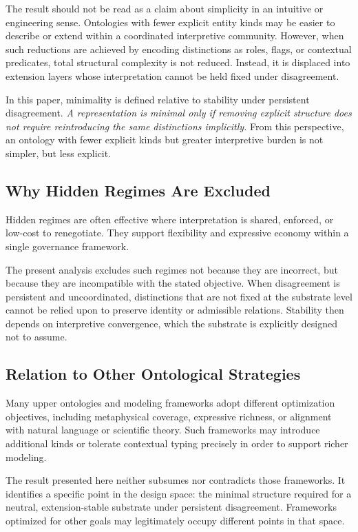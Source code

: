 The result should not be read as a claim about simplicity in an intuitive
or engineering sense.
Ontologies with fewer explicit entity kinds may be easier to describe or extend
within a coordinated interpretive community.
However, when such reductions are achieved by encoding \stabilitycritical{}
distinctions as roles, flags, or contextual predicates, total structural
complexity is not reduced.
Instead, it is displaced into extension layers whose interpretation cannot
be held fixed under disagreement.

In this paper, minimality is defined relative to stability under persistent disagreement.
\emph{A representation is minimal only if removing explicit structure does not
require reintroducing the same distinctions implicitly.}
From this perspective, an ontology with fewer explicit kinds but greater
interpretive burden is not simpler, but less explicit.

\subsection{Why Hidden Regimes Are Excluded}

Hidden regimes are often effective where interpretation is shared,
enforced, or low-cost to renegotiate.
They support flexibility and expressive economy within a single
governance framework.

The present analysis excludes such regimes not because they are incorrect,
but because they are incompatible with the stated objective.
When disagreement is persistent and uncoordinated, distinctions that are
not fixed at the substrate level cannot be relied upon to preserve identity
or admissible relations.
Stability then depends on interpretive convergence, which the substrate is
explicitly designed not to assume.

\subsection{Relation to Other Ontological Strategies}

Many upper ontologies and modeling frameworks adopt different optimization
objectives, including metaphysical coverage, expressive richness, or
alignment with natural language or scientific theory.
Such frameworks may introduce additional kinds or tolerate contextual
typing precisely in order to support richer modeling.

The result presented here neither subsumes nor contradicts those frameworks.
It identifies a specific point in the design space:
the minimal structure required for a neutral, extension-stable substrate under persistent disagreement.
Frameworks optimized for other goals may legitimately occupy different
points in that space.

